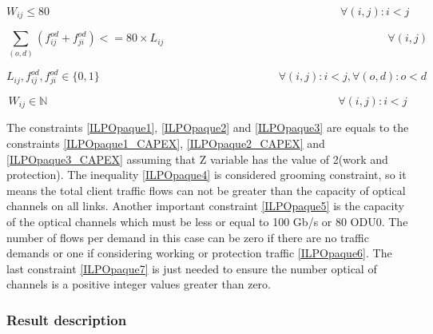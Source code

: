 \begin{equation}
W_{ij} \leq 80 \qquad  \qquad \qquad \qquad \qquad \qquad \qquad \qquad \qquad \qquad \qquad \qquad \qquad \forall(i,j) : i < j
\label{ILPOpaque5}
\end{equation}

\begin{equation}
\sum_{(o,d)} \left(f_{ij}^{od} + f_{ji}^{od}\right)<= 80 \times L_{ij} \qquad \qquad \qquad \qquad \qquad \qquad \qquad \qquad \qquad \qquad
\forall (i,j)
\label{ILPOpaqueX}
\end{equation}

\begin{equation}
L_{ij} , f_{ij}^{od} , f_{ji}^{od} \in \{0,1\}   \qquad \qquad \qquad \qquad \qquad \qquad \qquad \qquad
\forall(i,j) : i < j, \forall(o,d) : o < d
\label{ILPOpaque6}
\end{equation}

\begin{equation}
W_{ij} \in \mathbb{N}  \qquad \qquad \qquad \qquad \qquad \qquad \qquad \qquad \qquad \qquad \qquad \qquad \qquad
\forall(i,j) : i < j\label{ILPOpaque7}
\end{equation}

\vspace{10pt}

The constraints \ref{ILPOpaque1}, \ref{ILPOpaque2} and \ref{ILPOpaque3} are equals to the constraints \ref{ILPOpaque1_CAPEX}, \ref{ILPOpaque2_CAPEX} and \ref{ILPOpaque3_CAPEX} assuming that Z variable has the value of 2(work and protection).
The inequality \ref{ILPOpaque4} is considered grooming constraint, so it means the total client traffic flows can not be greater than the capacity of optical channels on all links. Another important constraint \ref{ILPOpaque5} is the capacity of the optical channels which must be less or equal to 100 Gb/s or 80 ODU0. The number of flows per demand in this case can be zero if there are no traffic demands or one if considering working or protection traffic \ref{ILPOpaque6}. The last constraint \ref{ILPOpaque7} is just needed to ensure the number optical of channels is a positive integer values greater than zero.\\

\subsubsection{Result description}

